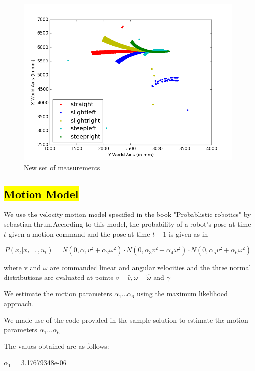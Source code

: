 \documentclass[10pt]{scrartcl}
\begin{document}
\begin{figure}[ht!]
\centering
\includegraphics[scale=0.6]{images/figure_1}
\caption{New set of measurements}
\label{fig:OriginalData}
\end{figure}

\newpage

\subsection*{\hl{Motion Model}}

We use the velocity motion model specified in the book "Probablistic robotics" by sebastian thrun.According to this model, the probability of a robot’s pose at time $t$ given a motion command and the pose at time $t − 1$ is given as in \cite{Alex}

\[
	P(x_t|x_{t-1},u_t) = N(0,\alpha_1 v^2+\alpha_2 \omega^2) \cdot
						 N(0,\alpha_3 v^2+\alpha_4 \omega^2) \cdot
						 N(0,\alpha_5 v^2+\alpha_6 \omega^2)
\]

where v and $\omega$ are commanded linear and angular velocities and the three normal distributions are evaluated at points 
$v - \hat{v} , \omega - \hat{\omega} $ and $\gamma$


We estimate the motion parameters $\alpha_1 ... \alpha_6$ using the maximum likelihood approach.

We made use of the code provided in the sample solution \cite{Alex} to estimate the  motion parameters $\alpha_1 ... \alpha_6$

The values obtained are as follows: 

$\alpha_1$ =  3.17679348e-06 
\end{document}
